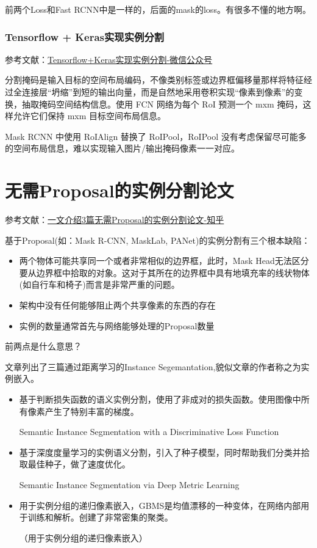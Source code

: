 前两个Loss和Fast RCNN中是一样的，后面的mask的loss。有很多不懂的地方啊。

\subsubsection{Tensorflow + Keras实现实例分割}

参考文献：\href{https://mp.weixin.qq.com/s/Fo1yd6W1EdCQGEflP26tHA}{Tensorflow+Keras实现实例分割-微信公众号}

分割掩码是输入目标的空间布局编码，不像类别标签或边界框偏移量那样将特征经过全连接层“坍缩”到短的输出向量，而是自然地采用卷积实现“像素到像素”的变换，抽取掩码空间结构信息。使用 FCN 网络为每个 RoI 预测一个 mxm 掩码，这样允许它们保持 mxm 目标空间布局信息。

Mask RCNN 中使用 RoIAlign 替换了 RoIPool，RoIPool 没有考虑保留尽可能多的空间布局信息，难以实现输入图片/输出掩码像素一一对应。


\section{无需Proposal的实例分割论文}

参考文献：\href{https://zhuanlan.zhihu.com/p/35770716}{一文介绍3篇无需Proposal的实例分割论文-知乎}

基于Proposal(如：Mask R-CNN, MaskLab, PANet)的实例分割有三个根本缺陷：
\begin{itemize}
\item 两个物体可能共享同一个或者非常相似的边界框，此时，Mask Head无法区分要从边界框中拾取的对象。这对于其所在的边界框中具有地填充率的线状物体(如自行车和椅子)而言是非常严重的问题。
\item 架构中没有任何能够阻止两个共享像素的东西的存在
\item 实例的数量通常首先与网络能够处理的Proposal数量
\end{itemize}

前两点是什么意思？

文章列出了三篇通过距离学习的Instance Segemantation,貌似文章的作者称之为实例嵌入。
\begin{itemize}
\item 基于判断损失函数的语义实例分割，使用了非成对的损失函数。使用图像中所有像素产生了特别丰富的梯度。

 Semantic Instance Segmentation with a Discriminative Loss Function

\item 基于深度度量学习的实例语义分割，引入了种子模型，同时帮助我们分类并拾取最佳种子，做了速度优化。

Semantic Instance Segmentation via Deep Metric Learning

\item 用于实例分组的递归像素嵌入，GBMS是均值漂移的一种变体，在网络内部用于训练和解析。创建了非常密集的聚类。

（用于实例分组的递归像素嵌入）

\end{itemize}

